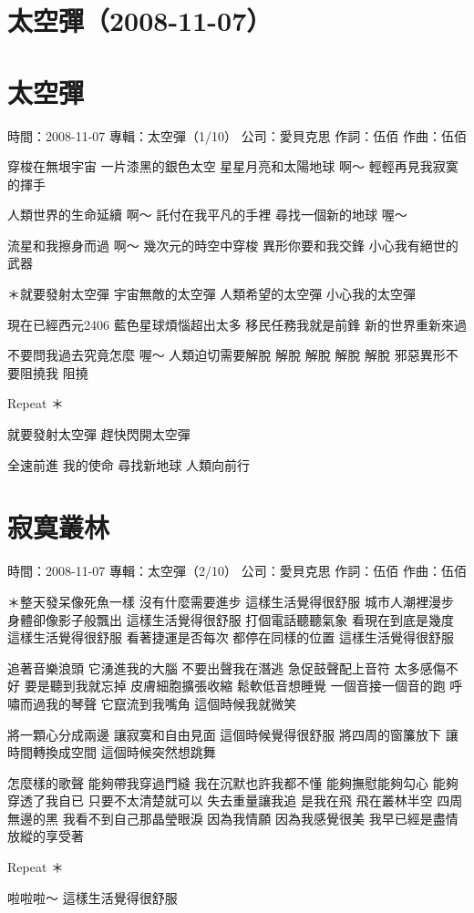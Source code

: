 \documentclass[UTF8,a4paper,oneside,twocolumn,12pt]{ctexbook}
\newcommand{\infopair}[2]{\textbullet #1：#2}
\newcommand{\zc}[1][伍佰]{\infopair{作詞}{#1}}
\newcommand{\zq}[1][伍佰]{\infopair{作曲}{#1}}
\newcommand{\zj}[1]{\infopair{專輯}{#1}}
\newcommand{\sj}[1]{\infopair{時間}{#1}}
\newcommand{\gs}[1]{\infopair{公司}{#1}}
\newenvironment{info}{\begin{flushleft}\kaishu
	}
	{\end{flushleft}\normalsize\yahei\par}
\newenvironment{lyric}{
	}
{}
\begin{document}
\section*{太空彈（2008-11-07）}
\section{太空彈}
\begin{info}
	\sj{2008-11-07}
	\zj{太空彈（1/10）}
	\gs{愛貝克思}
	\zc
	\zq
\end{info}
\begin{lyric}
	穿梭在無垠宇宙
	一片漆黑的銀色太空
	星星月亮和太陽地球
	啊～ 輕輕再見我寂寞的揮手

	人類世界的生命延續
	啊～ 託付在我平凡的手裡
	尋找一個新的地球
	喔～

	流星和我擦身而過
	啊～ 幾次元的時空中穿梭
	異形你要和我交鋒
	小心我有絕世的武器

	＊就要發射太空彈
	宇宙無敵的太空彈
	人類希望的太空彈
	小心我的太空彈

	現在已經西元2406
	藍色星球煩惱超出太多
	移民任務我就是前鋒
	新的世界重新來過

	不要問我過去究竟怎麼
	喔～ 人類迫切需要解脫
	解脫 解脫 解脫 解脫
	邪惡異形不要阻撓我
	阻撓

	Repeat ＊

	就要發射太空彈
	趕快閃開太空彈

	全速前進 我的使命
	尋找新地球 人類向前行
\end{lyric}

\section{寂寞叢林}
\begin{info}
	\sj{2008-11-07}
	\zj{太空彈（2/10）}
	\gs{愛貝克思}
	\zc
	\zq
\end{info}
\begin{lyric}
	＊整天發呆像死魚一樣 沒有什麼需要進步 這樣生活覺得很舒服
	城市人潮裡漫步 身體卻像影子般飄出 這樣生活覺得很舒服
	打個電話聽聽氣象 看現在到底是幾度 這樣生活覺得很舒服
	看著捷運是否每次 都停在同樣的位置 這樣生活覺得很舒服

	追著音樂浪頭 它湧進我的大腦 不要出聲我在潛逃
	急促鼓聲配上音符 太多感傷不好 要是聽到我就忘掉
	皮膚細胞擴張收縮 鬆軟低音想睡覺 一個音接一個音的跑
	呼嘯而過我的琴聲 它竄流到我嘴角 這個時候我就微笑

	將一顆心分成兩邊 讓寂寞和自由見面 這個時候覺得很舒服
	將四周的窗簾放下 讓時間轉換成空間 這個時候突然想跳舞

	怎麼樣的歌聲 能夠帶我穿過門縫 我在沉默也許我都不懂
	能夠撫慰能夠勾心 能夠穿透了我自已 只要不太清楚就可以
	失去重量讓我追 是我在飛
	飛在叢林半空 四周無邊的黑 我看不到自己那晶瑩眼淚
	因為我情願 因為我感覺很美 我早已經是盡情放縱的享受著

	Repeat ＊

	啦啦啦～ 這樣生活覺得很舒服
\end{lyric}
\end{document}
